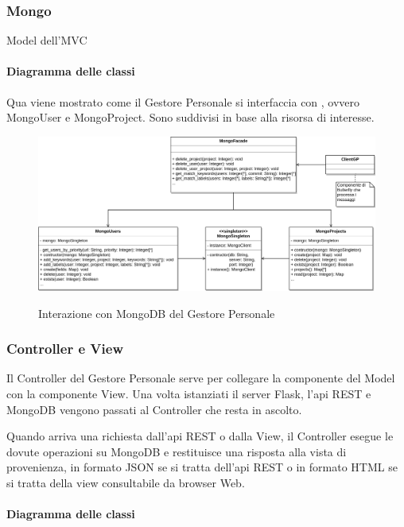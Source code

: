 \subsubsection{Mongo}
Model dell'MVC

    \paragraph{Diagramma delle classi}
    Qua viene mostrato come il Gestore Personale si interfaccia con , ovvero MongoUser e MongoProject. Sono suddivisi in base alla risorsa di interesse.

    \begin{figure}[H]
        \centering
        \includegraphics[width=\textwidth]{img/GP-Mongo.png}\\
        \caption{Interazione con MongoDB del Gestore Personale}
        \label{fig:GP-Mongo}
    \end{figure}


\subsubsection{Controller e View}
Il Controller del Gestore Personale serve per collegare la componente del Model con la componente View.
Una volta istanziati il server Flask, l'api REST e MongoDB vengono passati al Controller che resta in ascolto.\par
Quando arriva una richiesta dall'api REST o dalla View, il Controller esegue le dovute operazioni su MongoDB e restituisce una risposta alla vista di provenienza, in formato JSON se si tratta dell'api REST o in formato HTML se si tratta della view consultabile da browser Web.


    \paragraph{Diagramma delle classi}

